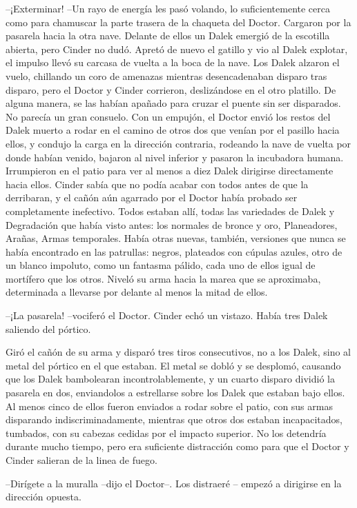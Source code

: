 --¡Exterminar! --Un rayo de energía les pasó volando, lo suficientemente cerca como para chamuscar la parte trasera de la chaqueta del Doctor. Cargaron por la pasarela hacia la otra nave.
Delante de ellos un Dalek emergió de la escotilla abierta, pero Cinder no dudó. Apretó de nuevo el gatillo y vio al Dalek explotar, el impulso llevó su carcasa de vuelta a la boca de la nave.
Los Dalek alzaron el vuelo, chillando un coro de amenazas mientras desencadenaban disparo tras disparo, pero el Doctor y Cinder corrieron, deslizándose en el otro platillo. De alguna manera, se las habían apañado para cruzar el puente sin ser disparados. No parecía un gran consuelo.
Con un empujón, el Doctor envió los restos del Dalek muerto a rodar en el camino de otros dos que venían por el pasillo hacia ellos, y condujo la carga en la dirección contraria, rodeando la nave de vuelta por donde habían venido, bajaron al nivel inferior y pasaron la incubadora humana.
Irrumpieron en el patio para ver al menos a diez Dalek dirigirse directamente hacia ellos. Cinder sabía que no podía acabar con todos antes de que la derribaran, y el cañón aún agarrado por el Doctor había probado ser completamente inefectivo.
Todos estaban allí, todas las variedades de Dalek y Degradación que había visto antes: los normales de bronce y oro, Planeadores, Arañas, Armas temporales. Había otras nuevas, también, versiones que nunca se había encontrado en las patrullas: negros, plateados con cúpulas azules, otro de un blanco impoluto, como un fantasma pálido, cada uno de ellos igual de mortífero que los otros.
Niveló su arma hacia la marea que se aproximaba, determinada a llevarse por delante al menos la mitad de ellos.

--¡La pasarela! --vociferó el Doctor. Cinder echó un vistazo. Había tres Dalek saliendo del pórtico. 

Giró el cañón de su arma y disparó tres tiros consecutivos, no a los Dalek, sino al metal del pórtico en el que estaban. El metal se dobló y se desplomó, causando que los Dalek bambolearan incontrolablemente, y un cuarto disparo dividió la pasarela en dos, enviandolos a estrellarse sobre los Dalek que estaban bajo ellos. Al menos cinco de ellos fueron enviados a rodar sobre el patio, con sus armas disparando indiscriminadamente, mientras que otros dos estaban incapacitados, tumbados, con su cabezas cedidas por el impacto superior.
No los detendría durante mucho tiempo, pero era suficiente distracción como para que el Doctor y Cinder salieran de la linea de fuego.

--Dirígete a la muralla --dijo el Doctor--. Los distraeré -- empezó a dirigirse en la dirección opuesta. 

